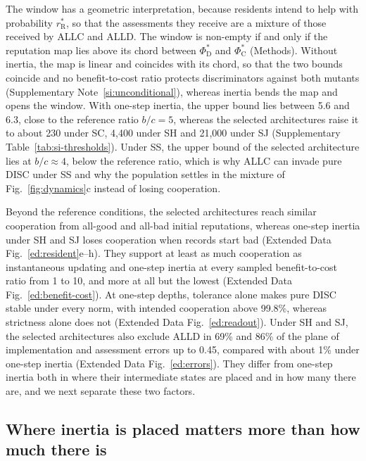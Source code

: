 \documentclass[10pt]{wlscirep}
\newcommand{\rR}{r_{\mathrm{R}}^{*}}
\newcommand{\PhiCs}{\Phi^{*}_{\mathrm{C}}}
\newcommand{\PhiDs}{\Phi^{*}_{\mathrm{D}}}
\theoremstyle{plain}
\theoremstyle{remark}
\begin{document}
The window has a geometric interpretation, because residents intend to help with probability $\rR$, so that the assessments they receive are a mixture of those received by ALLC and ALLD. The window is non-empty if and only if the reputation map lies above its chord between $\PhiDs$ and $\PhiCs$ (Methods). Without inertia, the map is linear and coincides with its chord, so that the two bounds coincide and no benefit-to-cost ratio protects discriminators against both mutants (Supplementary Note~\ref{si:unconditional}), whereas inertia bends the map and opens the window. With one-step inertia, the upper bound lies between 5.6 and 6.3, close to the reference ratio $b/c=5$, whereas the selected architectures raise it to about 230 under SC, 4,400 under SH and 21,000 under SJ (Supplementary Table~\ref{tab:si-thresholds}). Under SS, the upper bound of the selected architecture lies at $b/c\approx4$, below the reference ratio, which is why ALLC can invade pure DISC under SS and why the population settles in the mixture of Fig.~\ref{fig:dynamics}c instead of losing cooperation.

Beyond the reference conditions, the selected architectures reach similar cooperation from all-good and all-bad initial reputations, whereas one-step inertia under SH and SJ loses cooperation when records start bad (Extended Data Fig.~\ref{ed:resident}e--h). They support at least as much cooperation as instantaneous updating and one-step inertia at every sampled benefit-to-cost ratio from 1 to 10, and more at all but the lowest (Extended Data Fig.~\ref{ed:benefit-cost}). At one-step depths, tolerance alone makes pure DISC stable under every norm, with intended cooperation above 99.8\%, whereas strictness alone does not (Extended Data Fig.~\ref{ed:readout}). Under SH and SJ, the selected architectures also exclude ALLD in 69\% and 86\% of the plane of implementation and assessment errors up to 0.45, compared with about 1\% under one-step inertia (Extended Data Fig.~\ref{ed:errors}). They differ from one-step inertia both in where their intermediate states are placed and in how many there are, and we next separate these two factors.

\subsection*{Where inertia is placed matters more than how much there is}
\end{document}
